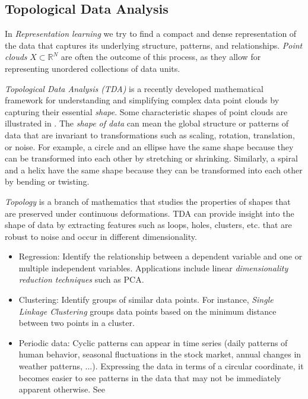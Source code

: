 \documentclass[11pt, a4paper]{amsart}
\begin{document}
\subsection{Topological Data Analysis}

In \emph{Representation learning} we try to find a compact and dense representation of the data that captures its underlying structure, patterns, and relationships.
\emph{Point clouds} $X \subset \mathbb{R}^{N}$ are often the outcome of this process, as they allow for representing unordered collections of data units.

\emph{Topological Data Analysis (TDA)} \cite{carlsson2022topologicaldataanalysis} is a recently developed mathematical framework for understanding and simplifying complex data point clouds by capturing their essential \emph{shape}.
Some characteristic shapes of point clouds are illustrated in .
The \emph{shape of data} can mean the global structure or patterns of data that are invariant to transformations such as scaling, rotation, translation, or noise.
For example, a circle and an ellipse have the same shape because they can be transformed into each other by stretching or shrinking. 
Similarly, a spiral and a helix have the same shape because they can be transformed into each other by bending or twisting.

\emph{Topology} is a branch of mathematics that studies the properties of shapes that are preserved under continuous deformations.
TDA can provide insight into the shape of data by extracting features such as loops, holes, clusters, etc. that are robust to noise and occur in different dimensionality.

\begin{itemize}
	\item Regression:
	Identify the relationship between a dependent variable and one or multiple independent variables.
	Applications include linear \emph{dimensionality reduction techniques} such as PCA.
	\item Clustering:
	Identify groups of similar data points.
	For instance, \emph{Single Linkage Clustering} groups data points based on the minimum distance between two points in a cluster.
	\item Periodic data:
	Cyclic patterns can appear in time series (daily patterns of human behavior, seasonal fluctuations in the stock market, annual changes in weather patterns, ...).
	Expressing the data in terms of a circular coordinate, it becomes easier to see patterns in the data that may not be immediately apparent otherwise.
	See 
\end{itemize}
\end{document}
